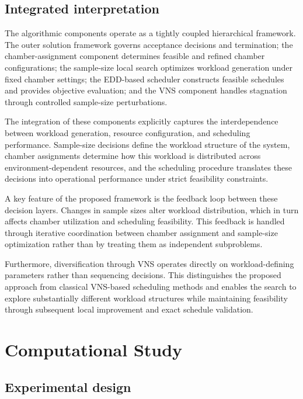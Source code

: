 \documentclass[11pt]{article}
\begin{document}
\subsection{Integrated interpretation}
\label{subsec:integrated_interpretation}

The algorithmic components operate as a tightly coupled hierarchical framework. The outer solution framework governs acceptance decisions and termination; the chamber-assignment component determines feasible and refined chamber configurations; the sample-size local search optimizes workload generation under fixed chamber settings; the EDD-based scheduler constructs feasible schedules and provides objective evaluation; and the VNS component handles stagnation through controlled sample-size perturbations.

The integration of these components explicitly captures the interdependence between workload generation, resource configuration, and scheduling performance. Sample-size decisions define the workload structure of the system, chamber assignments determine how this workload is distributed across environment-dependent resources, and the scheduling procedure translates these decisions into operational performance under strict feasibility constraints.

A key feature of the proposed framework is the feedback loop between these decision layers. Changes in sample sizes alter workload distribution, which in turn affects chamber utilization and scheduling feasibility. This feedback is handled through iterative coordination between chamber assignment and sample-size optimization rather than by treating them as independent subproblems.

Furthermore, diversification through VNS operates directly on workload-defining parameters rather than sequencing decisions. This distinguishes the proposed approach from classical VNS-based scheduling methods and enables the search to explore substantially different workload structures while maintaining feasibility through subsequent local improvement and exact schedule validation.

\section{Computational Study}
\label{sec:computational_study}

\subsection{Experimental design}
\label{subsec:exp_design}
\end{document}
